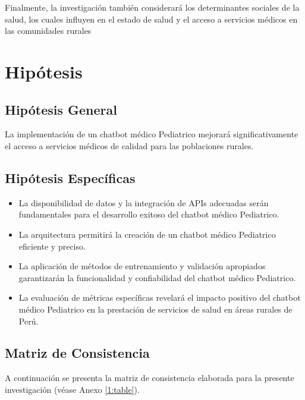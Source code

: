 Finalmente, la investigación también considerará los determinantes sociales de la salud, los cuales influyen en el estado de salud y el acceso a servicios médicos en las comunidades rurales

\section{Hipótesis}

\subsection{Hipótesis General}
\newcommand{\HipotesisGeneral}{
La implementación de un chatbot médico Pediatrico mejorará significativamente el acceso a servicios médicos de calidad para las poblaciones rurales.
}
\HipotesisGeneral
\subsection{Hipótesis Específicas}
\newcommand{\Hone}{
La disponibilidad de datos y la integración de APIs adecuadas serán fundamentales para el desarrollo exitoso del chatbot médico Pediatrico.
}
\newcommand{\Htwo}{
La arquitectura permitirá la creación de un chatbot médico Pediatrico eficiente y preciso.
}
\newcommand{\Hthree}{
La aplicación de métodos de entrenamiento y validación apropiados garantizarán la funcionalidad y confiabilidad del chatbot médico Pediatrico.
}
\newcommand{\Hfour}{
La evaluación de métricas específicas revelará el impacto positivo del chatbot médico Pediatrico en la prestación de servicios de salud en áreas rurales de Perú.
}
\begin{itemize}
	\item \Hone
	\item \Htwo
	\item \Hthree
	\item \Hfour

\end{itemize}

\subsection{Matriz de Consistencia}
A continuación se presenta la matriz de consistencia elaborada para la presente investigación (véase Anexo \ref{1:table}).


